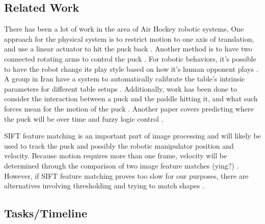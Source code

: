 \documentclass[letterpaper, 10 pt, conference]{ieeeconf}
\begin{document}
\subsection{Related Work}
There has been a  lot of work in the area of Air Hockey robotic systems, One approach for the physical system is to restrict motion to one axis of translation, and use a linear actuator to hit the puck back \cite{marra}. Another method is to have two connected rotating arms to control the puck \cite{bishop}. For robotic behaviors, it’s possible to have the robot change its play style based on how it’s human opponent plays \cite{namiki}. A group in Iran have a system to automatically calibrate the table’s intrinsic parameters for different table setups \cite{alizadeh}. Additionally, work has been done to consider the interaction between a puck and the paddle hitting it, and what such forces mean for the motion of the puck \cite{ghazvini} \cite{iguchi}. Another paper covers predicting where the puck will be over time and fuzzy logic control \cite{wang}.

SIFT feature matching is an important part of image processing and will likely be used to track the puck and possibly the robotic manipulator position and velocity. Because motion requires more than one frame, velocity will be determined through the comparison of two image feature matches (ying?) \cite{rahman}. However, if SIFT feature matching proves too slow for our purposes, there are alternatives involving thresholding and trying to match shapes \cite{wang} \cite{marra} \cite{bishop}.
\subsection{Tasks/Timeline}



\end{document}
